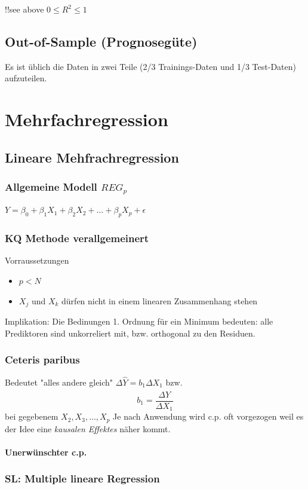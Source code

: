 \documentclass[a3paper, 8pt]{extarticle}
\begin{document}
\begin{multicols*}{5}
!!see above
$0 \leq R^2 \leq 1$
\subsection{Out-of-Sample (Prognosegüte)}
Es ist üblich die Daten in zwei Teile (2/3 Trainings-Daten und 1/3 Test-Daten) aufzuteilen.

\section{Mehrfachregression} 
\subsection{Lineare Mehfrachregression}
\subsubsection{Allgemeine Modell $REG_p$}
$Y=\beta_0+\beta_1X_1+\beta_2X_2+ \dots + \beta_pX_p+\epsilon$
\subsubsection{KQ Methode verallgemeinert}

Vorraussetzungen \begin{itemize}
    \item $p < N$
    \item $X_j$ und $X_k$ dürfen nicht in einem linearen Zusammenhang stehen
\end{itemize}

Implikation: Die Bedinungen 1. Ordnung für ein Minimum bedeuten: alle Prediktoren sind unkorreliert mit, bzw. orthogonal zu den Residuen.
\subsubsection{Ceteris paribus} Bedeutet "alles andere gleich"
$\Delta \hat{Y}=b_1\Delta X_1$ bzw. $$b_1=\frac{\Delta \hat{Y}}{\Delta X_1}$$ bei gegebenem $X_2, X_3, \dots , X_p$
Je nach Anwendung wird c.p. oft vorgezogen weil es der Idee eine \textit{kausalen Effektes} näher kommt.

\paragraph{Unerwünschter c.p.}


\subsubsection{SL: Multiple lineare Regression}


\end{multicols*}
\end{document}
